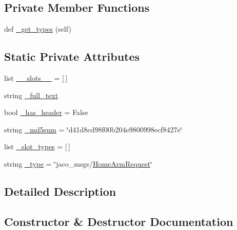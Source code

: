 \subsection*{Private Member Functions}
\begin{DoxyCompactItemize}
\item 
def \hyperlink{classjaco__msgs_1_1srv_1_1__HomeArm_1_1HomeArmRequest_ad677067df453f3bd470b14271161cd89}{\+\_\+get\+\_\+types} (self)
\end{DoxyCompactItemize}
\subsection*{Static Private Attributes}
\begin{DoxyCompactItemize}
\item 
list \hyperlink{classjaco__msgs_1_1srv_1_1__HomeArm_1_1HomeArmRequest_ac4ad5a59868324572b7ff00552177a17}{\+\_\+\+\_\+slots\+\_\+\+\_\+} = \mbox{[}$\,$\mbox{]}
\item 
string \hyperlink{classjaco__msgs_1_1srv_1_1__HomeArm_1_1HomeArmRequest_aa1e6e17ff8db3c3812168faa5ef5a209}{\+\_\+full\+\_\+text}
\item 
bool \hyperlink{classjaco__msgs_1_1srv_1_1__HomeArm_1_1HomeArmRequest_a6c04105b93a8e950276a6c1072f17514}{\+\_\+has\+\_\+header} = False
\item 
string \hyperlink{classjaco__msgs_1_1srv_1_1__HomeArm_1_1HomeArmRequest_af76cc57fe2dc2076808cfcf95909f90d}{\+\_\+md5sum} = \char`\"{}d41d8cd98f00b204e9800998ecf8427e\char`\"{}
\item 
list \hyperlink{classjaco__msgs_1_1srv_1_1__HomeArm_1_1HomeArmRequest_a408d6daf16c4b8e9c0ffef66989b7f4f}{\+\_\+slot\+\_\+types} = \mbox{[}$\,$\mbox{]}
\item 
string \hyperlink{classjaco__msgs_1_1srv_1_1__HomeArm_1_1HomeArmRequest_ae2e02f83931caf1d32c6afbdc97821c0}{\+\_\+type} = \char`\"{}jaco\+\_\+msgs/\hyperlink{classjaco__msgs_1_1srv_1_1__HomeArm_1_1HomeArmRequest}{Home\+Arm\+Request}\char`\"{}
\end{DoxyCompactItemize}


\subsection{Detailed Description}


\subsection{Constructor \& Destructor Documentation}
